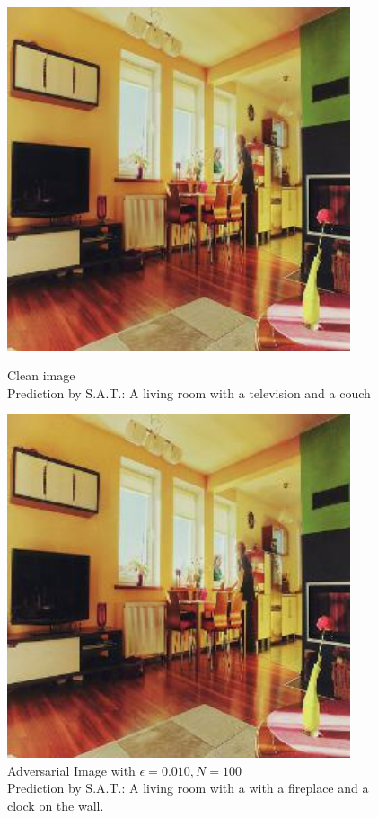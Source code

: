\begin{figure}[ht]
    \centering
    \begin{minipage}{0.45\textwidth}
        \centering
        \includegraphics[width=0.9\textwidth]{figures/Distract/n=100/samples/0.000/img_0.jpg} %
        \caption*{Clean image\\Prediction by S.A.T.: A living room with a television and a couch}
    \end{minipage}\hfill
    \begin{minipage}{0.45\textwidth}
        \centering
        \includegraphics[width=0.9\textwidth]{figures/Distract/n=100/samples/0.010/img_0.jpg} %
        \caption*{Adversarial Image with $\epsilon=0.010, N=100$\\Prediction by S.A.T.: A living room with a with a fireplace and a clock on the wall.}
    \end{minipage}
\end{figure}

